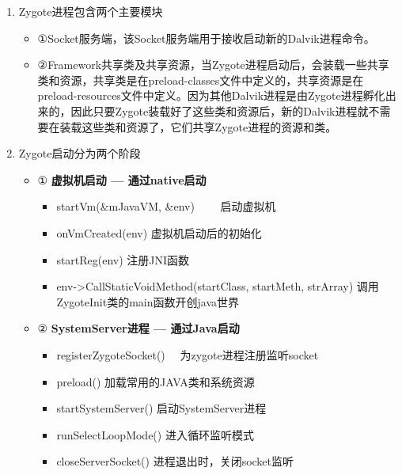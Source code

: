 \documentclass[9pt, b5paper]{article}
\begin{document}
\begin{enumerate}
\item Zygote进程包含两个主要模块
\label{sec-5-0-4-1}
\begin{itemize}
\item ①Socket服务端，该Socket服务端用于接收启动新的Dalvik进程命令。
\item ②Framework共享类及共享资源，当Zygote进程启动后，会装载一些共享类和资源，共享类是在preload-classes文件中定义的，共享资源是在preload-resources文件中定义。因为其他Dalvik进程是由Zygote进程孵化出来的，因此只要Zygote装载好了这些类和资源后，新的Dalvik进程就不需要在装载这些类和资源了，它们共享Zygote进程的资源和类。
\end{itemize}
\item Zygote启动分为两个阶段
\label{sec-5-0-4-2}
\begin{itemize}
\item ① \textbf{虚拟机启动 --- 通过native启动}
\begin{itemize}
\item startVm(\&mJavaVM, \&env) 　　启动虚拟机　
\item onVmCreated(env)         虚拟机启动后的初始化
\item startReg(env)             注册JNI函数
\item env->CallStaticVoidMethod(startClass, startMeth, strArray) 调用ZygoteInit类的main函数开创java世界　
\end{itemize}
\item ② \textbf{SystemServer进程 --- 通过Java启动}
\begin{itemize}
\item registerZygoteSocket() 　为zygote进程注册监听socket
\item preload()            加载常用的JAVA类和系统资源
\item startSystemServer()    启动SystemServer进程
\item runSelectLoopMode()  进入循环监听模式
\item closeServerSocket()    进程退出时，关闭socket监听
\end{itemize}
\end{itemize}
\end{enumerate}
\end{document}
